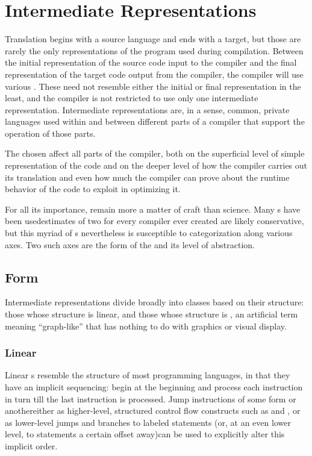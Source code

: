 \section{Intermediate Representations}\label{background:compilers:irs}
Translation begins with a source language and ends with a target, but those are rarely the only representations of the program used during compilation. Between the initial representation of the source code input to the compiler and the final representation of the target code output from the compiler, the compiler will use various . These need not resemble either the initial or final representation in the least, and the compiler is not restricted to use only one intermediate representation. Intermediate representations are, in a sense, common, private languages used within and between different parts of a compiler that support the operation of those parts.

The \IRs chosen affect all parts of the compiler, both on the superficial level of simple representation of the code and on the deeper level of how the compiler carries out its translation and even how much the compiler can prove about the runtime behavior of the code to exploit in optimizing it.

For all its importance, \IRs remain more a matter of craft than science. Many s have been used\empause estimates of two for every compiler ever created are likely conservative\empause , but this myriad of s nevertheless is susceptible to categorization along various axes. Two such axes are the form of the \IR and its level of abstraction.

\subsection{Form}
Intermediate representations divide broadly into classes based on their structure: those whose structure is linear, and those whose structure is , an artificial term meaning ``graph-like'' that has nothing to do with graphics or visual display.

\subsubsection{Linear}
Linear s resemble the structure of most programming languages, in that they have an implicit sequencing: begin at the beginning and process each instruction in turn till the last instruction is processed. Jump instructions of some form or another\empause either as higher-level, structured control flow constructs such as  and , or as lower-level jumps and branches to labeled statements (or, at an even lower level, to statements a certain offset away)\empause can be used to explicitly alter this implicit order.

